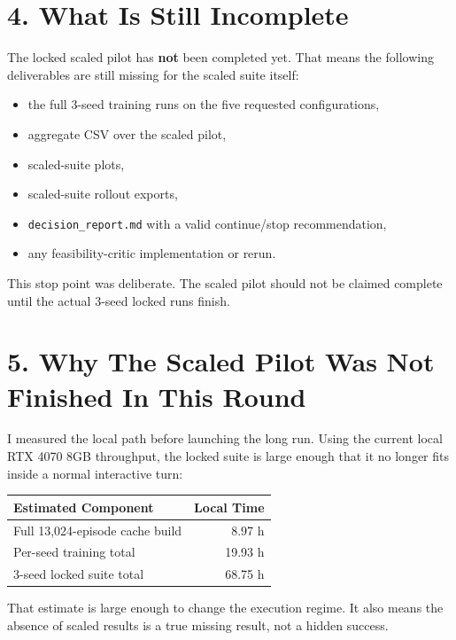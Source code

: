 \documentclass[11pt]{article}
\begin{document}
\section*{4. What Is Still Incomplete}

The locked scaled pilot has \textbf{not} been completed yet.
That means the following deliverables are still missing for the scaled suite itself:

\begin{itemize}
\item the full 3-seed training runs on the five requested configurations,
\item aggregate CSV over the scaled pilot,
\item scaled-suite plots,
\item scaled-suite rollout exports,
\item \texttt{decision\_report.md} with a valid continue/stop recommendation,
\item any feasibility-critic implementation or rerun.
\end{itemize}

This stop point was deliberate.
The scaled pilot should not be claimed complete until the actual 3-seed locked runs finish.

\section*{5. Why The Scaled Pilot Was Not Finished In This Round}

I measured the local path before launching the long run.
Using the current local RTX 4070 8GB throughput, the locked suite is large enough that it no longer fits inside a normal interactive turn:

\begin{center}
\begin{tabular}{lr}
\toprule
Estimated Component & Local Time \\
\midrule
Full 13,024-episode cache build & 8.97 h \\
Per-seed training total & 19.93 h \\
3-seed locked suite total & 68.75 h \\
\bottomrule
\end{tabular}
\end{center}

That estimate is large enough to change the execution regime.
It also means the absence of scaled results is a true missing result, not a hidden success.
\end{document}
